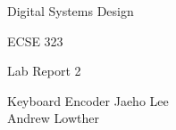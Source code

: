 \documentclass[12pt,letterpaper,titlepage]{article}
\begin{document}
\begin{titlepage}
	\centering
	{\LARGE Digital Systems Design \par}
	{\LARGE ECSE 323 \par}
	\vspace{.5cm}
	{\LARGE Lab Report 2 \par}
	{\LARGE Keyboard Encoder}
	\vfill
	Jaeho Lee \\
	Andrew Lowther \\
\end{titlepage}



%
\end{document}
